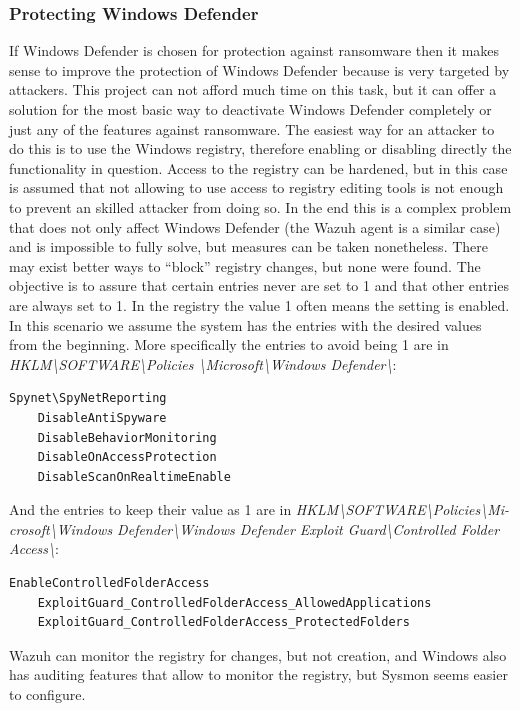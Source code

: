 \subsubsection{Protecting Windows Defender}
If Windows Defender is chosen for protection against ransomware then it makes sense to improve the protection of Windows Defender because is very targeted by attackers.
This project can not afford much time on this task, but it can offer a solution for the most basic way to deactivate Windows Defender completely or just any of the features against ransomware.
The easiest way for an attacker to do this is to use the Windows registry, therefore enabling or disabling directly the functionality in question.
\linej
Access to the registry can be hardened, but in this case is assumed that not allowing to use access to registry editing tools is not enough to prevent an skilled attacker from doing so.
\linej
In the end this is a complex problem that does not only affect Windows Defender (the Wazuh agent is a similar case) and is impossible to fully solve, but measures can be taken nonetheless.
\linej
\linej
There may exist better ways to ``block'' registry changes, but none were found.
The objective is to assure that certain entries never are set to 1 and that other entries are always set to 1.
In the registry the value 1 often means the setting is enabled.
In this scenario we assume the system has the entries with the desired values from the beginning.
\linej
More specifically the entries to avoid being 1 are in \textit{HKLM{\textbackslash}SOFTWARE{\textbackslash}Policies {\textbackslash}Microsoft{\textbackslash}Windows Defender{\textbackslash}}:
\begin{lstlisting}[style=xml,frame=none]
	Spynet\SpyNetReporting
	DisableAntiSpyware
	DisableBehaviorMonitoring
	DisableOnAccessProtection
	DisableScanOnRealtimeEnable
\end{lstlisting}
\linej
And the entries to keep their value as 1 are in \textit{HKLM{\textbackslash}SOFTWARE{\textbackslash}Policies{\textbackslash}Mi- crosoft{\textbackslash}Windows Defender{\textbackslash}Windows Defender Exploit Guard{\textbackslash}Controlled Folder Access{\textbackslash}}:
\begin{lstlisting}[style=xml,frame=none]
	EnableControlledFolderAccess
	ExploitGuard_ControlledFolderAccess_AllowedApplications
	ExploitGuard_ControlledFolderAccess_ProtectedFolders
\end{lstlisting}
\linej
Wazuh can monitor the registry for changes, but not creation, and Windows also has auditing features that allow to monitor the registry, but Sysmon seems easier to configure.
